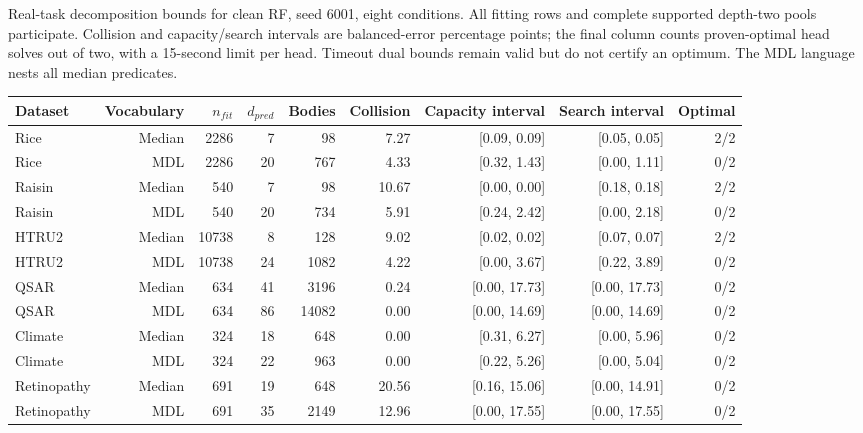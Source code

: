 \begin{kbtable}
\centering
\caption{Real-task decomposition bounds for clean RF, seed 6001, eight conditions. All fitting rows and complete supported depth-two pools participate. Collision and capacity/search intervals are balanced-error percentage points; the final column counts proven-optimal head solves out of two, with a 15-second limit per head. Timeout dual bounds remain valid but do not certify an optimum. The MDL language nests all median predicates.}
\label{tab:real-certificates}
\small
\begin{adjustbox}{max width=\linewidth}
\begin{tabular}{lrrrrrrrr}
\toprule
Dataset & Vocabulary & $n_{fit}$ & $d_{pred}$ & Bodies & Collision & Capacity interval & Search interval & Optimal \\
\midrule
Rice & Median & 2286 & 7 & 98 & 7.27 & [0.09, 0.09] & [0.05, 0.05] & 2/2 \\
Rice & MDL & 2286 & 20 & 767 & 4.33 & [0.32, 1.43] & [0.00, 1.11] & 0/2 \\
Raisin & Median & 540 & 7 & 98 & 10.67 & [0.00, 0.00] & [0.18, 0.18] & 2/2 \\
Raisin & MDL & 540 & 20 & 734 & 5.91 & [0.24, 2.42] & [0.00, 2.18] & 0/2 \\
HTRU2 & Median & 10738 & 8 & 128 & 9.02 & [0.02, 0.02] & [0.07, 0.07] & 2/2 \\
HTRU2 & MDL & 10738 & 24 & 1082 & 4.22 & [0.00, 3.67] & [0.22, 3.89] & 0/2 \\
QSAR & Median & 634 & 41 & 3196 & 0.24 & [0.00, 17.73] & [0.00, 17.73] & 0/2 \\
QSAR & MDL & 634 & 86 & 14082 & 0.00 & [0.00, 14.69] & [0.00, 14.69] & 0/2 \\
Climate & Median & 324 & 18 & 648 & 0.00 & [0.31, 6.27] & [0.00, 5.96] & 0/2 \\
Climate & MDL & 324 & 22 & 963 & 0.00 & [0.22, 5.26] & [0.00, 5.04] & 0/2 \\
Retinopathy & Median & 691 & 19 & 648 & 20.56 & [0.16, 15.06] & [0.00, 14.91] & 0/2 \\
Retinopathy & MDL & 691 & 35 & 2149 & 12.96 & [0.00, 17.55] & [0.00, 17.55] & 0/2 \\
\bottomrule
\end{tabular}
\end{adjustbox}
\end{kbtable}
